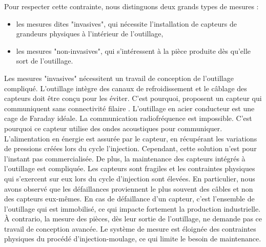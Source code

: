 Pour respecter cette contrainte, nous distinguons deux grands types de mesures :
\begin{itemize}
\item les mesures dites "invasives", qui nécessite l'installation de capteurs de grandeurs physiques à l'intérieur de l'outillage,
\item les mesures "non-invasives", qui s'intéressent à la pièce produite dès qu'elle sort de l'outillage.
\end{itemize}


Les mesures "invasives" nécessitent un travail de conception de l'outillage compliqué.
L'outillage intègre des canaux de refroidissement et le câblage des capteurs doit être conçu pour les éviter.
C'est pourquoi, \citeauthor{gao_multivariate_2012} proposent un capteur qui communiquent sans connectivité filaire \cite{kazmer_feasibility_2011, gao_multivariate_2012}.
L'outillage en acier conducteur est une cage de Faraday idéale.
La communication radiofréquence  est impossible.
C'est pourquoi ce capteur utilise des ondes acoustiques pour communiquer.
L'alimentation en énergie est assurée par le capteur, en récupérant les variations de pressions créées lors du cycle l'injection.
Cependant, cette solution n'est pour l'instant pas commercialisée.
De plus, la maintenance des capteurs intégrés à l'outillage est compliquée.
Les capteurs sont fragiles et les contraintes physiques qui s'exercent sur eux lors du cycle d'injection sont élevées.
En particulier, nous avons observé que les défaillances proviennent le plus souvent des câbles et non des capteurs eux-mêmes.
En cas de défaillance d'un capteur, c'est l'ensemble de l'outillage qui est immobilisé, ce qui impacte fortement la production industrielle.
À contrario, la mesure des pièces, dès leur sortie de l'outillage, ne demande pas ce travail de conception avancée.
Le système de mesure est éloignée des contraintes physiques du procédé d'injection-moulage, ce qui limite le besoin de maintenance.

